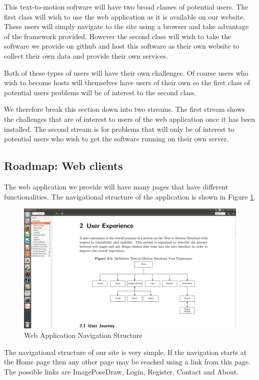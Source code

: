 \documentclass{scrreprt}
\begin{document}
This text-to-motion software will have two broad classes of potential users.
The first class will wish to use the web application as it is available on our
website.  These users will simply navigate to the site using a browser and take
advantage of the framework provided. However the second class will wish to take
the software we provide on github and host this software as their own website
to collect their own data and provide their own services.

Both of these types of users will have their own challenges.  Of course users
who wish to become hosts will themselves have users of their own so the first
class of potential users problems will be of interest to the second class.

We therefore break this section down into two streams.  The first stream shows
the challenges that are of interest to users of the web application once it has
been installed.  The second stream is for problems that will only be of
interest to potential users who wish to get the software running on their own
server.

\subsection{Roadmap: Web clients}

The web application we provide will have many pages that have different
functionalities.  The navigational structure of the application is shown in
Figure \ref{fig:navStruct}.

\begin{figure}
  \includegraphics[width=\linewidth]{apppicture.png}
  \caption{Web Application Navigation Structure}
  \label{fig:navStruct}
\end{figure}

The navigational structure of our site is very simple.  If the navigation
starts at the Home page then any other page may be reached using a link from
this page.  The possible links are ImagePoseDraw, Login, Register, Contact and
About.
\end{document}
